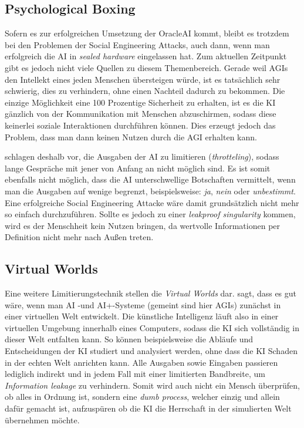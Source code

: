         \subsection{Psychological Boxing}

        Sofern es zur erfolgreichen Umsetzung der OracleAI kommt, bleibt es trotzdem bei den Problemen der Social
        Engineering Attacks, auch dann, wenn man erfolgreich die AI in \textit{sealed hardware} eingelassen hat.\cite[s. 4]{ebhardt2018threat}
        Zum aktuellen Zeitpunkt gibt es jedoch nicht viele Quellen zu diesem Themenbereich. Gerade weil AGIs den Intellekt
        eines jeden Menschen übersteigen würde, ist es tatsächlich sehr schwierig, dies zu verhindern, ohne einen Nachteil
        dadurch zu bekommen.\cite[s. 204]{yampolskiy2012leakproofing} Die einzige Möglichkeit eine 100 Prozentige Sicherheit
        zu erhalten, ist es die KI gänzlich von der Kommunikation mit Menschen abzuschirmen, sodass diese keinerlei
        soziale Interaktionen durchführen können. Dies erzeugt jedoch das Problem, dass man dann keinen Nutzen durch
        die AGI erhalten kann.

        \citealp{armstrongforthcoming} schlagen deshalb vor, die Ausgaben der AI zu limitieren (\textit{throtteling}), sodass
        lange Gespräche mit jener von Anfang an nicht möglich sind.\cite[s. 306]{armstrongforthcoming} Es ist somit
        ebenfalls nicht möglich, dass die AI unterschwellige Botschaften vermittelt, wenn man die Ausgaben auf wenige
        begrenzt, beispielsweise: \textit{ja}, \textit{nein} oder \textit{unbestimmt}. Eine erfolgreiche Social Engineering
        Attacke wäre damit grundsätzlich nicht mehr so einfach durchzuführen.\cite[s. 309]{armstrongforthcoming}
        Sollte es jedoch zu einer \textit{leakproof singularity} kommen, wird es der Menschheit kein Nutzen bringen, da
        wertvolle Informationen per Definition nicht mehr nach Außen treten.

        \subsection{Virtual Worlds}
        Eine weitere Limitierungstechnik stellen die \textit{Virtual Worlds} dar. \citep{chalmers2010singularity} sagt,
        dass es gut wäre, wenn man AI -und AI+-Systeme (gemeint sind hier AGIs) zunächst in einer virtuellen Welt
        entwickelt. \cite[s. 37]{chalmers2010singularity} Die künstliche Intelligenz läuft also in einer virtuellen Umgebung
        innerhalb eines Computers, sodass die KI sich vollständig in dieser Welt entfalten kann. So können beispielsweise
        die Abläufe und Entscheidungen der KI studiert und analysiert werden, ohne dass die KI Schaden in der echten Welt
        anrichten kann. Alle Ausgaben sowie Eingaben passieren lediglich indirekt und in jedem Fall mit einer limitierten
        Bandbreite, um \textit{Information leakage} zu verhindern. \cite[s. 310]{armstrongforthcoming} Somit wird auch
        nicht ein Mensch überprüfen, ob alles in Ordnung ist, sondern eine \textit{dumb process}, welcher einzig und allein
        dafür gemacht ist, aufzuspüren ob die KI die Herrschaft in der simulierten Welt übernehmen möchte.

